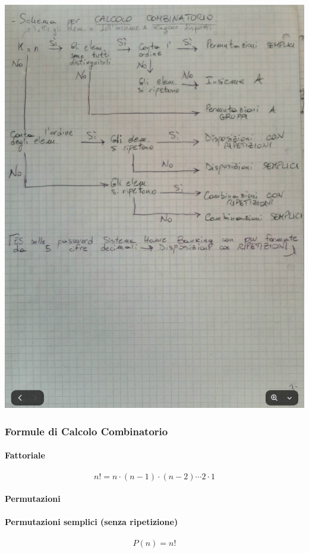 \documentclass{article}
\begin{document}
\begin{center}
\includegraphics[width=1\linewidth]{./immagini/schemaCombinatorio.png}
\end{center}

\subsubsection{Formule di Calcolo Combinatorio}

\paragraph{Fattoriale}
\[
n! = n \cdot (n-1) \cdot (n-2) \cdots 2 \cdot 1
\]

\paragraph{Permutazioni}

\paragraph{Permutazioni semplici (senza ripetizione)}
\[
P(n) = n!
\]
\end{document}
